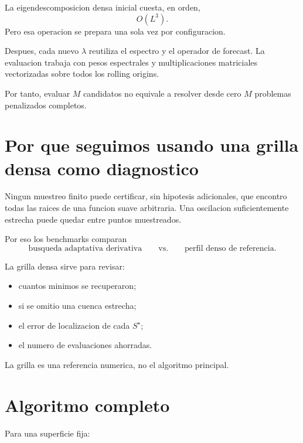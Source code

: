\documentclass[11pt]{article}
\begin{document}
La eigendescomposicion densa inicial cuesta, en orden,
\[
O(L^3).
\]
Pero esa operacion se prepara una sola vez por configuracion.

Despues, cada nuevo \(\lambda\) reutiliza el espectro y el operador de forecast.
La evaluacion trabaja con pesos espectrales y multiplicaciones matriciales
vectorizadas sobre todos los rolling origins.

Por tanto, evaluar \(M\) candidatos no equivale a resolver desde cero
\(M\) problemas penalizados completos.

\section{Por que seguimos usando una grilla densa como diagnostico}

Ningun muestreo finito puede certificar, sin hipotesis adicionales, que
encontro todas las raices de una funcion suave arbitraria. Una oscilacion
suficientemente estrecha puede quedar entre puntos muestreados.

Por eso los benchmarks comparan
\[
\text{busqueda adaptativa derivativa}
\qquad\text{vs.}\qquad
\text{perfil denso de referencia}.
\]

La grilla densa sirve para revisar:

\begin{itemize}[leftmargin=2em]
    \item cuantos minimos se recuperaron;
    \item si se omitio una cuenca estrecha;
    \item el error de localizacion de cada \(S^\star\);
    \item el numero de evaluaciones ahorradas.
\end{itemize}

La grilla es una referencia numerica, no el algoritmo principal.

\section{Algoritmo completo}

Para una superficie fija:
\end{document}
